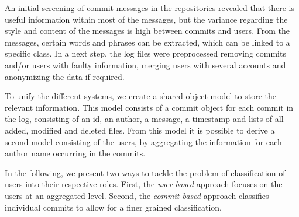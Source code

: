 
An initial screening of commit messages in the repositories revealed that there is useful information within most of the messages, but the variance regarding the style and content of the messages is high between commits and users.
From the messages, certain words and phrases can be extracted, which can be linked to a specific class. In a next step, the log files were preprocessed removing commits and/or users with faulty information, merging users with several accounts and anonymizing the data if required. 

To unify the different systems, we create a shared object model to store the relevant information.
This model consists of a commit object for each commit in the log, consisting of an id, an author, a message, a timestamp and lists of all added, modified and deleted files. From this model it is possible to derive a second model consisting of the users, by aggregating the information for each author name occurring in the commits.

In the following, we present two ways to tackle the problem of classification of users into their respective roles. First, the \emph{user-based} approach focuses on the users at an aggregated level. Second, the \emph{commit-based} approach classifies individual commits to allow for a finer grained classification. 


